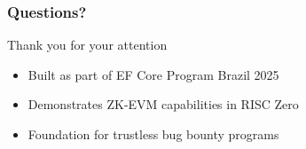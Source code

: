 \documentclass{beamer}
\begin{document}
\begin{frame}
\frametitle{Questions?}
\begin{center}
\Large Thank you for your attention

\vspace{1cm}

\begin{itemize}
    \item Built as part of EF Core Program Brazil 2025
    \item Demonstrates ZK-EVM capabilities in RISC Zero
    \item Foundation for trustless bug bounty programs
\end{itemize}

\end{center}
\end{frame}
\end{document}
